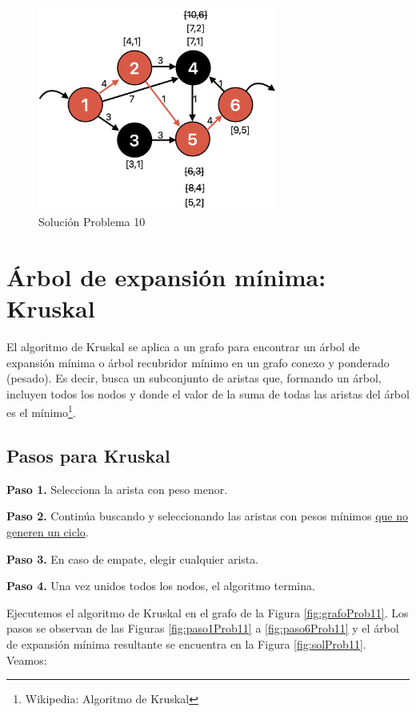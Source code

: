 \documentclass[12pt]{article}  %
\begin{document}
\begin{figure}[H]
\centering
\caption{Solución Problema 10}
\label{fig:resProb10}
\includegraphics[width=0.7\textwidth]{solProb10.png}
\end{figure}

\section{Árbol de expansión mínima: Kruskal}
El algoritmo de Kruskal se aplica a un grafo para encontrar un árbol de expansión mínima o árbol recubridor mínimo en un grafo conexo y ponderado (pesado). Es decir, busca un subconjunto de aristas que, formando un árbol, incluyen todos los nodos y donde el valor de la suma de todas las aristas del árbol es el mínimo\footnote{Wikipedia: Algoritmo de Kruskal}.

\subsection{Pasos para Kruskal}
\textbf{Paso 1.} Selecciona la arista con peso menor.

\textbf{Paso 2.} Continúa buscando y seleccionando las aristas con pesos mínimos \underline{que no generen un ciclo}.

\textbf{Paso 3.} En caso de empate, elegir cualquier arista.

\textbf{Paso 4.} Una vez unidos todos los nodos, el algoritmo termina.

Ejecutemos el algoritmo de Kruskal en el grafo de la Figura \ref{fig:grafoProb11}. Los pasos se observan de las Figuras \ref{fig:paso1Prob11} a \ref{fig:paso6Prob11} y el árbol de expansión mínima resultante se encuentra en la Figura \ref{fig:solProb11}. Veamos:
\end{document}
